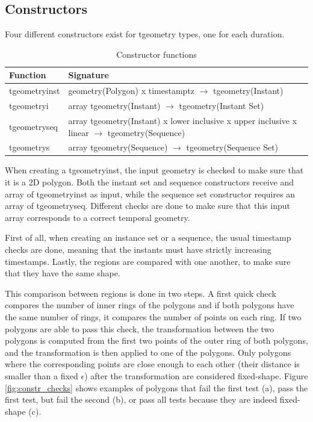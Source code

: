 \subsection{Constructors}
\label{section:constructors}

Four different constructors exist for tgeometry types, one for each duration.

\begin{table}[h!]
    \centering
    \begin{tabularx}{\textwidth}{|l|X|}
    \hline
    \textbf{Function}   & \textbf{Signature} \\ 
    \hline
    tgeometryinst       & geometry(Polygon) x timestamptz $\rightarrow$ tgeometry(Instant) \\
    \hline
    tgeometryi          & array tgeometry(Instant) $\rightarrow$ tgeometry(Instant Set) \\
    \hline
    tgeometryseq        & array tgeometry(Instant) x lower inclusive x upper inclusive x linear $\rightarrow$ tgeometry(Sequence) \\
    \hline
    tgeometrys          & array tgeometry(Sequence) $\rightarrow$ tgeometry(Sequence Set) \\
    \hline
    \end{tabularx}
    \caption{Constructor functions}
    \label{table:constructor_funcs}
\end{table}

When creating a tgeometryinst, the input geometry is checked to make sure that it is a 2D polygon. Both the instant set and sequence constructors receive and array of tgeometryinst as input, while the sequence set constructor requires an array of tgeometryseq. Different checks are done to make sure that this input array corresponds to a correct temporal geometry.

First of all, when creating an instance set or a sequence, the usual timestamp checks are done, meaning that the instants must have strictly increasing timestamps. Lastly, the regions are compared with one another, to make sure that they have the same shape.

This comparison between regions is done in two steps. A first quick check compares the number of inner rings of the polygons and if both polygons have the same number of rings, it compares the number of points on each ring. If two polygons are able to pass this check, the transformation between the two polygons is computed from the first two points of the outer ring of both polygons, and the transformation is then applied to one of the polygons. Only polygons where the corresponding points are close enough to each other (their distance is smaller than a fixed $\epsilon$) after the transformation are considered fixed-shape. Figure \ref{fig:constr_checks} shows examples of polygons that fail the first test (a), pass the first test, but fail the second (b), or pass all tests because they are indeed fixed-shape (c).

